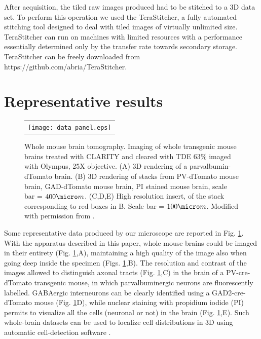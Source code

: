 \documentclass[12pt]{spieman}  %
\begin{document}
\begin{spacing}{2}
After acquisition, the tiled raw images produced had to be stitched to a 3D data set. To perform this operation we used the TeraStitcher\cite{Bria2012}, a fully automated stitching tool designed to deal with tiled images of virtually unlimited size. TeraStitcher can run on machines with limited resources with a performance essentially determined only by the transfer rate towards secondary storage. TeraStitcher can be freely downloaded from https://github.com/abria/TeraStitcher.

\section{Representative results}

	\begin{figure}
   \begin{center}
   \begin{tabular}{c}
   \texttt{[image: data\_panel.eps]}
   \end{tabular}
   \end{center}
   \caption{\label{fig:LSMdata} Whole mouse brain tomography. Imaging of whole transgenic mouse brains treated with CLARITY and cleared with TDE 63\% imaged with Olympus, 25X objective. (A) 3D rendering of a parvalbumin-dTomato brain. (B) 3D rendering of stacks from PV-dTomato mouse brain, GAD-dTomato mouse brain,  PI stained mouse brain, scale bar = $400 \micro m$. (C,D,E) High resolution insert, of the stack corresponding to red boxes in B. Scale bar = $100 \micro m$. Modified with permission from \cite{Costantini}.} 
   \end{figure}
	
Some representative data produced by our microscope are reported in Fig. \ref{fig:LSMdata}. With the apparatus described in this paper, whole mouse brains could be imaged in their entirety (Fig. \ref{fig:LSMdata},A), maintaining a high quality of the image also when going deep inside the specimen (Figs. \ref{fig:LSMdata},B). The resolution and contrast of the images allowed to distinguish axonal tracts (Fig. \ref{fig:LSMdata},C) in the brain of a PV-cre-dTomato transgenic mouse, in which parvalbuminergic neurons are fluorescently labelled. GABAergic interneurons can be clearly identified using a GAD2-cre-dTomato mouse (Fig. \ref{fig:LSMdata}D), while nuclear staining with propidium iodide (PI) permits to visualize all the cells (neuronal or not) in the brain (Fig. \ref{fig:LSMdata},E). Such whole-brain datasets can be used to localize cell distributions in 3D using automatic cell-detection software \cite{Frasconi2014}.


\end{spacing}
\end{document}
